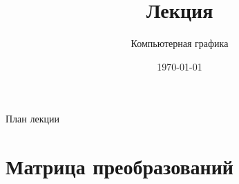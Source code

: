 \documentclass[10pt]{beamer}
\date{\today}
\title{Лекция \lecdni \\ \LectionTheme}
\subtitle{Компьютерная графика}
\begin{document}
 		 

    
    \QRFRAME
	
	
	\frame{\maketitle}
	
	
	
	\begin{frame}{План лекции}
		\tableofcontents
	\end{frame}
	
	
	
	\section{Матрица преобразований}
	
	\frame{\sectionpage}
	
\end{document}
